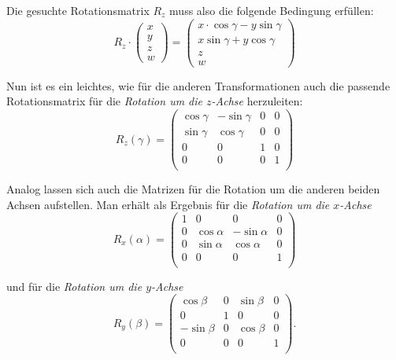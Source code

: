 Die gesuchte Rotationsmatrix $R_{z}$ muss also die folgende Bedingung erfüllen:
\begin{equation}
 R_{z} \cdot
 \begin{pmatrix}
  x \\
  y \\
  z \\
  w
 \end{pmatrix}
 = 
 \begin{pmatrix}
  x \cdot \cos \gamma - y \sin \gamma \\
  x \sin \gamma + y \cos \gamma \\
  z \\
  w
 \end{pmatrix}
\end{equation}

Nun ist es ein leichtes, wie für die anderen Transformationen auch die passende Rotationsmatrix für die \emph{Rotation um die $z$-Achse} herzuleiten:
\begin{equation}
 R_z{(\gamma)}
 = 
 \begin{pmatrix}
  \cos \gamma & -\sin \gamma & 0 & 0 \\
  \sin \gamma &  \cos \gamma & 0 & 0 \\
  0 & 0 & 1 & 0 \\
  0 & 0 & 0 & 1 \\
 \end{pmatrix}
\end{equation}

Analog lassen sich auch die Matrizen für die Rotation um die anderen beiden Achsen aufstellen. Man erhält als Ergebnis für die \emph{Rotation um die $x$-Achse}
\begin{equation}
 R_x{(\alpha)}
 = 
 \begin{pmatrix}
  1 & 0 & 0 & 0 \\
  0 & \cos \alpha & -\sin \alpha & 0 \\
  0 & \sin \alpha &  \cos \alpha & 0 \\
  0 & 0 & 0 & 1 \\
 \end{pmatrix}
\end{equation}

und für die \emph{Rotation um die $y$-Achse}
\begin{equation}
 R_y{(\beta)}
 = 
 \begin{pmatrix}
  \cos \beta & 0 & \sin \beta & 0 \\
  0 & 1 & 0 & 0 \\
  -\sin \beta & 0 & \cos \beta & 0 \\
  0 & 0 & 0 & 1 \\
 \end{pmatrix}.
\end{equation}

